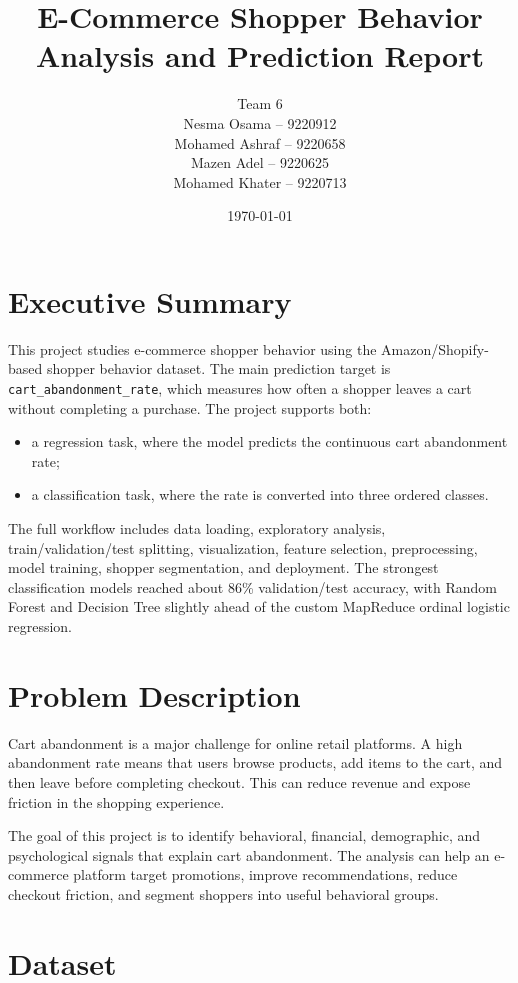 \documentclass[11pt,a4paper]{article}
\title{E-Commerce Shopper Behavior Analysis and Prediction Report}
\author{Team 6\\[0.5em]
Nesma Osama -- 9220912\\
Mohamed Ashraf -- 9220658\\
Mazen Adel -- 9220625\\
Mohamed Khater -- 9220713}
\date{\today}
\begin{document}
\maketitle
\tableofcontents
\newpage

\section{Executive Summary}

This project studies e-commerce shopper behavior using the Amazon/Shopify-based shopper behavior dataset. The main prediction target is \texttt{cart\_abandonment\_rate}, which measures how often a shopper leaves a cart without completing a purchase. The project supports both:
\begin{itemize}
  \item a regression task, where the model predicts the continuous cart abandonment rate;
  \item a classification task, where the rate is converted into three ordered classes.
\end{itemize}

The full workflow includes data loading, exploratory analysis, train/validation/test splitting, visualization, feature selection, preprocessing, model training, shopper segmentation, and deployment. The strongest classification models reached about 86\% validation/test accuracy, with Random Forest and Decision Tree slightly ahead of the custom MapReduce ordinal logistic regression.

\section{Problem Description}

Cart abandonment is a major challenge for online retail platforms. A high abandonment rate means that users browse products, add items to the cart, and then leave before completing checkout. This can reduce revenue and expose friction in the shopping experience.

The goal of this project is to identify behavioral, financial, demographic, and psychological signals that explain cart abandonment. The analysis can help an e-commerce platform target promotions, improve recommendations, reduce checkout friction, and segment shoppers into useful behavioral groups.

\section{Dataset}
\end{document}
